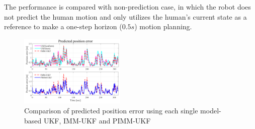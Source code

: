 \documentclass[journal]{IEEEtran}
\begin{document}
	The performance is compared with non-prediction case, in which the robot does not predict the human motion and only utilizes the human's current state as a reference to make a one-step horizon ($0.5s$) motion planning. 
\begin{figure}
		\centering		\includegraphics[width=0.45\textwidth]{figures/prediction_pos_error4}
		\caption{Comparison of predicted position error using each single model-based UKF, IMM-UKF and PIMM-UKF}
		\label{fig:pred}
	\end{figure}
\end{document}
